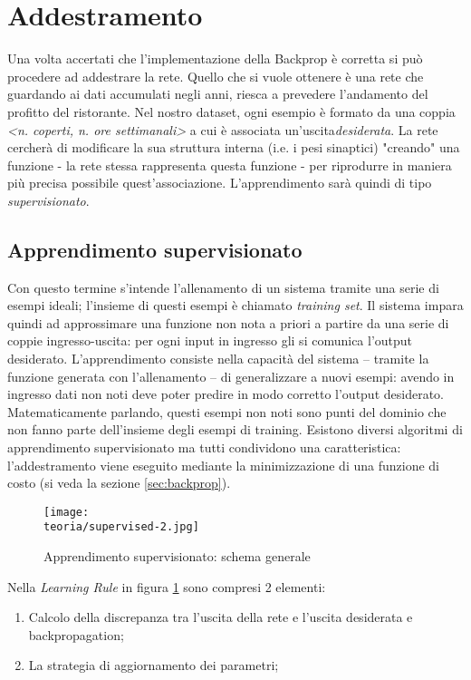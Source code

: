

\section{Addestramento}
\label{ref:training}
Una volta accertati che l'implementazione della Backprop è corretta si può procedere ad addestrare la rete. Quello che si vuole ottenere è una rete che guardando ai dati accumulati negli anni, riesca a prevedere l'andamento del profitto del ristorante. Nel nostro dataset, ogni esempio è formato da una coppia \emph{<n. coperti, n. ore settimanali>} a cui è associata un'uscita\emph{desiderata}. La rete cercherà di modificare la sua struttura interna (i.e. i pesi sinaptici) "creando" una funzione - la rete stessa rappresenta questa funzione - per riprodurre in maniera più precisa possibile quest'associazione. L'apprendimento sarà quindi di tipo \emph{supervisionato}.
\subsection{Apprendimento supervisionato}
Con questo termine s'intende l'allenamento di un sistema tramite una serie di esempi ideali; l'insieme di questi esempi è chiamato
\emph{training set}. Il sistema impara quindi ad approssimare una funzione non nota a priori a partire da una serie di coppie ingresso-uscita: per ogni input in ingresso gli si comunica l'output desiderato.
L'apprendimento consiste nella capacità del sistema – tramite la funzione generata con l'allenamento – di generalizzare a nuovi esempi: avendo in ingresso dati non noti deve poter predire in modo corretto l'output desiderato.
Matematicamente parlando, questi esempi non noti sono punti del dominio che non fanno parte dell'insieme degli esempi di training.
Esistono diversi algoritmi di apprendimento supervisionato ma tutti condividono una caratteristica: l'addestramento
viene eseguito mediante la minimizzazione di una funzione di costo (si veda la sezione \ref{sec:backprop}).
\begin{figure}[h!]
 \centering
 \texttt{[image: \\teoria/supervised-2.jpg]}
 \caption{Apprendimento supervisionato: schema generale}
 \label{fig:supervised}
\end{figure}
Nella \emph{Learning Rule} in figura \ref{fig:supervised} sono compresi 2 elementi: 
\begin{enumerate}
\item Calcolo della discrepanza tra l'uscita della rete e l'uscita desiderata e backpropagation;
\item La strategia di aggiornamento dei parametri;
\end{enumerate}

